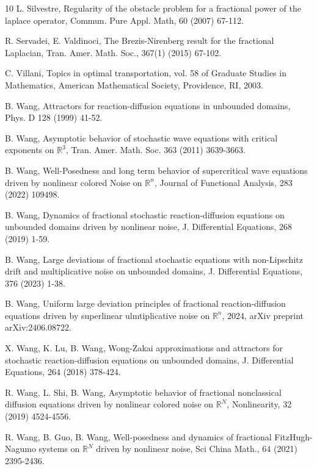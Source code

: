 \documentclass[11pt]{article}
\numberwithin{equation}{section}
\begin{document}
\begin{thebibliography}{10}
L. Silvestre, Regularity of the
obstacle problem for a fractional power of the laplace operator, Commun. Pure Appl. Math, 60 (2007) 67-112.

R. Servadei, E. Valdinoci, The Brezis-Nirenberg result for the fractional Laplacian,  Tran. Amer. Math. Soc.,  367(1) (2015) 67-102.


C. Villani, Topics in optimal transportation, vol. 58 of Graduate Studies in Mathematics,
American Mathematical Society, Providence, RI, 2003.

B. Wang, Attractors for reaction-diffusion equations in unbounded domains, Phys. D 128 (1999) 41-52.


 B. Wang, Asymptotic behavior of stochastic
wave equations with critical exponents on $\mathbb{R}^{3}$,
Tran. Amer. Math. Soc. 363 (2011) 3639-3663.

B. Wang, Well-Posedness and long term
behavior of supercritical wave equations
driven by nonlinear colored Noise on
$\mathbb{R}^n$, Journal of
Functional Analysis, 283 (2022) 109498.



B. Wang,
Dynamics of fractional stochastic reaction-diffusion equations on
unbounded domains driven by nonlinear noise,
J. Differential Equations,  268 (2019) 1-59.

B. Wang, Large deviations of fractional stochastic equations with non-Lipschitz drift and
multiplicative noise on unbounded domains, J. Differential Equations, 376 (2023) 1-38.


B. Wang,
Uniform large deviation principles of fractional reaction-diffusion equations
driven by superlinear ulmtiplicative noise on $\mathbb{R}^n$, 2024, arXiv preprint arXiv:2406.08722.




X. Wang, K. Lu, B. Wang, Wong-Zakai approximations and attractors for stochastic reaction-diffusion equations on unbounded domains, J. Differential Equations, 264 (2018) 378-424.


 R. Wang, L. Shi,  B. Wang,
Asymptotic behavior of fractional nonclassical diffusion equations
driven by nonlinear colored noise on $\mathbb{R}^N$, Nonlinearity, 32 (2019) 4524-4556.


 R. Wang, B. Guo, B. Wang, Well-posedness and dynamics of fractional FitzHugh-Nagumo systems
on $\mathbb {R}^N$ driven by nonlinear noise, Sci China Math.,
64 (2021) 2395-2436.



\end{thebibliography}
\end{document}
